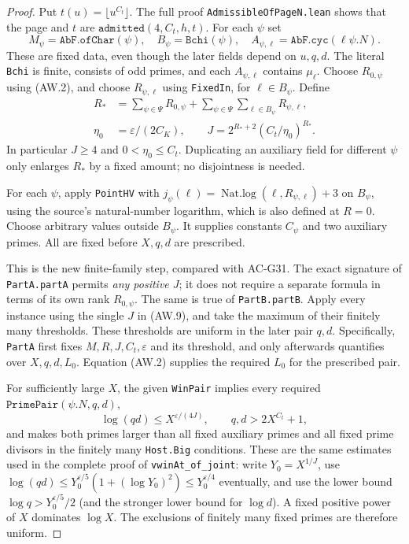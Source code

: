 \begin{proof}
Put $t(u)=\lfloor u^{C_t}\rfloor$.
The full proof \texttt{AdmissibleOfPageN.lean} shows that the
page and $t$ are $\texttt{admitted}(4,C_t,h,t)$.
For each $\psi$ set
\[
 M_\psi=\texttt{AbF.ofChar}(\psi),\quad
 B_\psi=\texttt{Bchi}(\psi),\quad
 A_{\psi,\ell}=\texttt{AbF.cyc}(\ell\psi.N).
\]
These are fixed data, even though the later fields depend on $u,q,d$.
The literal \texttt{Bchi} is finite, consists of odd primes, and
each $A_{\psi,\ell}$ contains $\mu_\ell$.
Choose $R_{0,\psi}$ using (AW.2), and choose
$R_{\psi,\ell}$ using \texttt{FixedIn}, for
$\ell\in B_\psi$.  Define
\[
 \begin{split}
 R_*&=\sum_{\psi\in\Psi}R_{0,\psi}
            +\sum_{\psi\in\Psi}\sum_{\ell\in B_\psi}R_{\psi,\ell},\\
 \eta_0&=\varepsilon/(2C_K),\qquad
 J=2^{R_*+2}(C_t/\eta_0)^{R_*}.
 \end{split}                                                 \tag{AW.9}
\]
In particular $J\geq4$ and $0<\eta_0\leq C_t$.
Duplicating an auxiliary field for different $\psi$ only enlarges
$R_*$ by a fixed amount; no disjointness is needed.

For each $\psi$, apply \texttt{PointHV} with
$j_\psi(\ell)=\operatorname{Nat.log}(\ell,R_{\psi,\ell})+3$
on $B_\psi$, using the source's natural-number logarithm,
which is also defined at $R=0$.
Choose arbitrary values outside $B_\psi$.
It supplies constants $C_\psi$ and two auxiliary primes.
All are fixed before $X,q,d$ are prescribed.

This is the new finite-family step, compared with AC-G31.
The exact signature of \texttt{PartA.partA} permits
\emph{any positive $J$}; it does not require a separate formula
in terms of its own rank $R_{0,\psi}$.
The same is true of \texttt{PartB.partB}.
Apply every instance using the single $J$ in (AW.9), and take the
maximum of their finitely many thresholds.
These thresholds are uniform in the later pair $q,d$.
Specifically, \texttt{PartA} first fixes $M,R,J,C_t,\varepsilon$
and its threshold, and only afterwards quantifies over $X,q,d,L_0$.
Equation (AW.2) supplies the required $L_0$ for the prescribed pair.

For sufficiently large $X$, the given \texttt{WinPair} implies
every required $\texttt{PrimePair}(\psi.N,q,d)$,
\[
 \log(qd)\leq X^{\varepsilon/(4J)},\qquad
 q,d>2X^{C_t}+1,                                                 \tag{AW.10}
\]
and makes both primes larger than all fixed auxiliary primes and
all fixed prime divisors in the finitely many \texttt{Host.Big}
conditions.  These are the same estimates used in the complete
proof of \texttt{vwinAt\_of\_joint}:
write $Y_0=X^{1/J}$, use
$\log(qd)\leq Y_0^{\varepsilon/5}(1+(\log Y_0)^2)
\leq Y_0^{\varepsilon/4}$ eventually, and use the lower bound
$\log q>Y_0^{\varepsilon/5}/2$ (and the stronger lower bound
for $\log d$).  A fixed positive power of $X$ dominates $\log X$.
The exclusions of finitely many fixed primes are therefore uniform.


\end{proof}
